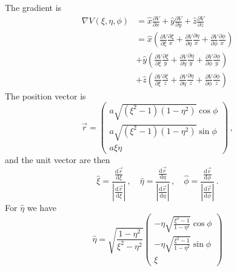 \documentclass[a4paper,10pt]{article}
\newcommand{\ud}{\mathrm{d}}
\begin{document}
  The gradient is
  \begin{equation}\begin{split}
   \nabla V(\xi, \eta, \phi) &= \hat{x} \frac{\partial V}{\partial x} + \hat{y} \frac{\partial V}{\partial y} + \hat{z} \frac{\partial V}{\partial z} \\
                             &= \hat{x} \left( \frac{\partial V}{\partial \xi} \frac{\partial \xi}{x}
                                + \frac{\partial V}{\partial \eta} \frac{\partial \eta}{x}
                                + \frac{\partial V}{\partial \phi} \frac{\partial \phi}{x} \right) \\
                             &+ \hat{y} \left( \frac{\partial V}{\partial \xi} \frac{\partial \xi}{y}
                                + \frac{\partial V}{\partial \eta} \frac{\partial \eta}{y}
                                + \frac{\partial V}{\partial \phi} \frac{\partial \phi}{y} \right) \\
                             &+ \hat{z} \left( \frac{\partial V}{\partial \xi} \frac{\partial \xi}{z}
                                + \frac{\partial V}{\partial \eta} \frac{\partial \eta}{z}
                                + \frac{\partial V}{\partial \phi} \frac{\partial \phi}{z} \right)
  \end{split}\end{equation}
  The position vector is
  \begin{equation}
   \vec{r} = \begin{pmatrix}
               a \sqrt{(\xi^2-1)(1-\eta^2)}\cos{\phi}\\
               a \sqrt{(\xi^2-1)(1-\eta^2)}\sin{\phi}\\
               a\xi\eta
             \end{pmatrix}\, ,
  \end{equation}
  and the unit vector are then
  \begin{equation}
    \hat{\xi} = \frac{\frac{\ud \vec{r}}{\ud \xi}}{\left|\frac{\ud \vec{r}}{\ud \xi}\right|}\,, \quad
    \hat{\eta} = \frac{\frac{\ud \vec{r}}{\ud \eta}}{\left|\frac{\ud \vec{r}}{\ud \eta}\right|}\,, \quad
    \hat{\phi} = \frac{\frac{\ud \vec{r}}{\ud \phi}}{\left|\frac{\ud \vec{r}}{\ud \phi}\right|}\, .
  \end{equation}
  For \(\hat{\eta}\) we have
  \begin{equation}
   \hat{\eta} = \sqrt{\frac{1-\eta^2}{\xi^2-\eta^2}}
     \begin{pmatrix}
       -\eta \sqrt{\frac{\xi^2-1}{1-\eta^2}} \cos{\phi}\\
       -\eta \sqrt{\frac{\xi^2-1}{1-\eta^2}} \sin{\phi}\\
       \xi
     \end{pmatrix}
  \end{equation}
\end{document}
